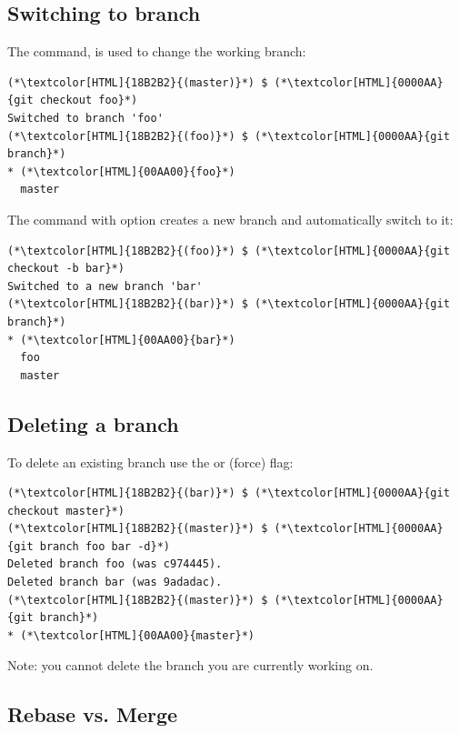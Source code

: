 \subsection{Switching to branch}
\begin{frame}[fragile]
  \subslidetitle
  The  command, is used to change the working branch:
  \begin{lstlisting}
(*\textcolor[HTML]{18B2B2}{(master)}*) $ (*\textcolor[HTML]{0000AA}{git checkout foo}*)
Switched to branch 'foo'
(*\textcolor[HTML]{18B2B2}{(foo)}*) $ (*\textcolor[HTML]{0000AA}{git branch}*)
* (*\textcolor[HTML]{00AA00}{foo}*)
  master
\end{lstlisting}

  The  command with  option creates a new branch and automatically switch to it:
  \begin{lstlisting}
(*\textcolor[HTML]{18B2B2}{(foo)}*) $ (*\textcolor[HTML]{0000AA}{git checkout -b bar}*)
Switched to a new branch 'bar'
(*\textcolor[HTML]{18B2B2}{(bar)}*) $ (*\textcolor[HTML]{0000AA}{git branch}*)
* (*\textcolor[HTML]{00AA00}{bar}*)
  foo
  master
\end{lstlisting}
\end{frame}

\subsection{Deleting a branch}
\begin{frame}[fragile]
  \subslidetitle
  To delete an existing branch use the  or  (force) flag:
\begin{lstlisting}
(*\textcolor[HTML]{18B2B2}{(bar)}*) $ (*\textcolor[HTML]{0000AA}{git checkout master}*)
(*\textcolor[HTML]{18B2B2}{(master)}*) $ (*\textcolor[HTML]{0000AA}{git branch foo bar -d}*)
Deleted branch foo (was c974445).
Deleted branch bar (was 9adadac).
(*\textcolor[HTML]{18B2B2}{(master)}*) $ (*\textcolor[HTML]{0000AA}{git branch}*)
* (*\textcolor[HTML]{00AA00}{master}*)
\end{lstlisting}

  Note: you cannot delete the branch you are currently working on.
\end{frame}

\subsection{Rebase vs. Merge}
\begin{frame}[fragile]
    \subslidetitle
\end{frame}

